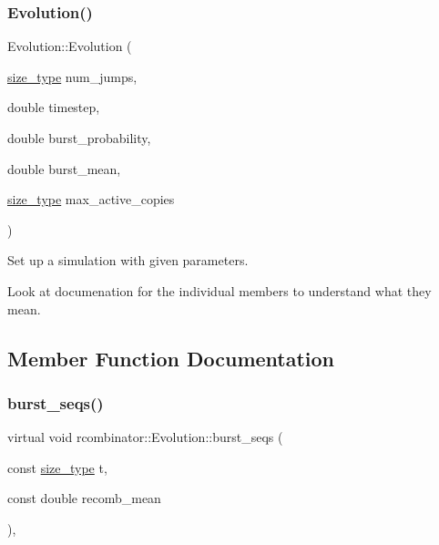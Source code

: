 \subsubsection{\texorpdfstring{Evolution()}{Evolution()}}
{\footnotesize\ttfamily Evolution\+::\+Evolution (\begin{DoxyParamCaption}\item[{\mbox{\hyperlink{constants_8h_abcd18a5521fc90ff6e7b00e4fee98397}{size\+\_\+type}}}]{num\+\_\+jumps,  }\item[{double}]{timestep,  }\item[{double}]{burst\+\_\+probability,  }\item[{double}]{burst\+\_\+mean,  }\item[{\mbox{\hyperlink{constants_8h_abcd18a5521fc90ff6e7b00e4fee98397}{size\+\_\+type}}}]{max\+\_\+active\+\_\+copies }\end{DoxyParamCaption})}



Set up a simulation with given parameters. 

Look at documenation for the individual members to understand what they mean. 

\subsection{Member Function Documentation}
\mbox{\label{classrcombinator_1_1Evolution_ad4af177c458f2d6add719e64c534761a}} 
\subsubsection{\texorpdfstring{burst\+\_\+seqs()}{burst\_seqs()}}
{\footnotesize\ttfamily virtual void rcombinator\+::\+Evolution\+::burst\+\_\+seqs (\begin{DoxyParamCaption}\item[{const \mbox{\hyperlink{constants_8h_abcd18a5521fc90ff6e7b00e4fee98397}{size\+\_\+type}}}]{t,  }\item[{const double}]{recomb\+\_\+mean }\end{DoxyParamCaption})\hspace{0.3cm}{\ttfamily [protected]}, {}}



